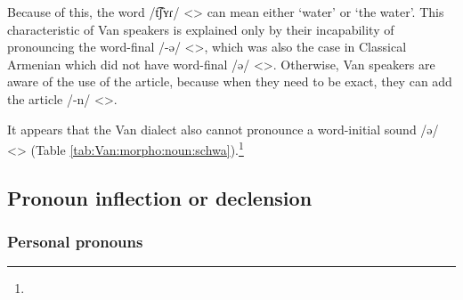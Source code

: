 \begin{exe}
\end{exe}




Because of this, the word /t͡ʃʏɾ/ <> can mean either `water' or `the water'. This characteristic of Van speakers is explained only by their incapability of pronouncing the word-final /-ə/ <>, which was also the case in Classical Armenian which did not have word-final /ə/ <>. Otherwise, Van speakers are aware of the use of the article, because when they need to be exact, they can add the article /-n/ <>. 

It appears that the Van dialect also cannot pronounce a word-initial sound /ə/ <> (Table \ref{tab:Van:morpho:noun:schwa}).\footnote{}


\begin{table}[H]
	\centering
	\caption{Absence of word-initial schwa in the Van dialect}
	\label{tab:Van:morpho:noun:schwa}
\end{table}

\subsection{Pronoun inflection or declension}
\subsubsection{Personal pronouns}
\begin{adjarianpage}\label{page:144}\end{adjarianpage}%



